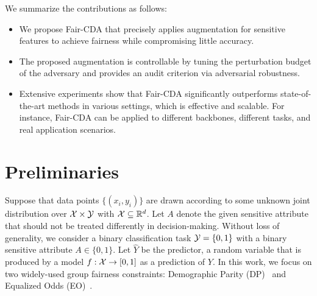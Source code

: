 \documentclass[letterpaper]{article} %
\begin{document}
We summarize the contributions as follows:
\begin{itemize}
    \item We propose Fair-CDA that precisely applies augmentation for sensitive features to achieve fairness while compromising little accuracy. 
    \item The proposed augmentation is  controllable by tuning the perturbation budget of the adversary and provides an audit criterion via adversarial robustness.
    \item Extensive experiments show that Fair-CDA significantly outperforms state-of-the-art methods in various settings, which is effective and  scalable. For instance, Fair-CDA can be applied to different backbones, different tasks, and real application scenarios.
    
    
    
\end{itemize}



\section{Preliminaries}\label{sec:definition}

Suppose that data points $\{(x_i,y_i)\}$ are drawn according to some unknown joint distribution over $\mathcal X \times \mathcal Y$ with $\mathcal X \subseteq \mathbb R^d$. Let $A$ denote the given sensitive attribute that should not be treated differently in decision-making.
Without loss of generality, we consider a binary classification task $\mathcal Y = \{0,1\}$ with a binary sensitive attribute $A \in \{0,1\}.$
Let $\hat{Y}$ be the predictor, a random variable that is produced by a model $f:\mathcal X  \rightarrow [0,1]$ as a prediction of $Y$.
In this work, we focus on two widely-used group fairness constraints: Demographic Parity (DP)~\cite{dwork2011fairness} and Equalized Odds (EO)~\cite{hardt2016equality}.
\end{document}
